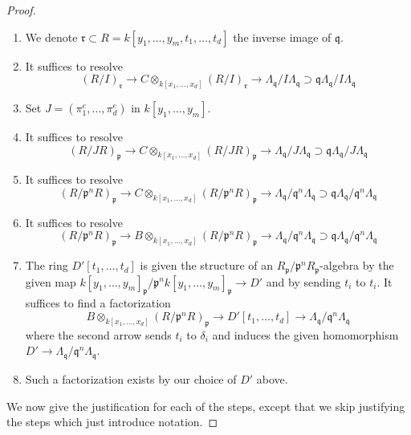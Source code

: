 \begin{proof}
\begin{enumerate}
$$
R/I
\to
C \otimes_{k[x_1, \ldots, x_d]} R/I
\to
\Lambda/I\Lambda \supset \mathfrak q/I\Lambda
$$
\item
\label{smoothing-item-set-r}
We denote $\mathfrak r \subset R = k[y_1, \ldots, y_m, t_1, \ldots, t_d]$
the inverse image of $\mathfrak q$.
\item
\label{smoothing-item-third-resolve}
It suffices to resolve
$$
(R/I)_\mathfrak r \to
C \otimes_{k[x_1, \ldots, x_d]} (R/I)_\mathfrak r \to
\Lambda_\mathfrak q/I\Lambda_\mathfrak q
\supset
\mathfrak q\Lambda_\mathfrak q/I\Lambda_\mathfrak q
$$
\item
\label{smoothing-item-fourth-resolve}
Set $J = (\pi_1^e, \ldots, \pi_d^e)$ in $k[y_1, \ldots, y_m]$.
\item
\label{smoothing-item-fifth-resolve}
It suffices to resolve
$$
(R/JR)_\mathfrak p \to
C \otimes_{k[x_1, \ldots, x_d]} (R/JR)_\mathfrak p \to
\Lambda_\mathfrak q/J\Lambda_\mathfrak q
\supset
\mathfrak q\Lambda_\mathfrak q/J\Lambda_\mathfrak q
$$
\item
\label{smoothing-item-sixth-resolve}
It suffices to resolve
$$
(R/\mathfrak p^nR)_\mathfrak p \to
C \otimes_{k[x_1, \ldots, x_d]} (R/\mathfrak p^nR)_\mathfrak p \to
\Lambda_\mathfrak q/\mathfrak q^n\Lambda_\mathfrak q
\supset
\mathfrak q\Lambda_\mathfrak q/\mathfrak q^n\Lambda_\mathfrak q
$$
\item
\label{smoothing-item-seventh-resolve}
It suffices to resolve
$$
(R/\mathfrak p^nR)_\mathfrak p \to
B \otimes_{k[x_1, \ldots, x_d]} (R/\mathfrak p^nR)_\mathfrak p \to
\Lambda_\mathfrak q/\mathfrak q^n\Lambda_\mathfrak q
\supset
\mathfrak q\Lambda_\mathfrak q/\mathfrak q^n\Lambda_\mathfrak q
$$
\item
\label{smoothing-item-eighth-resolve}
The ring $D'[t_1, \ldots, t_d]$ is given the structure of an
$R_\mathfrak p/\mathfrak p^nR_\mathfrak p$-algebra by the given map
$k[y_1, \ldots, y_m]_\mathfrak p/\mathfrak p^n k[y_1, \ldots, y_m]_\mathfrak p
\to D'$ and by sending $t_i$ to $t_i$. It suffices to find a factorization
$$
B \otimes_{k[x_1, \ldots, x_d]} (R/\mathfrak p^nR)_\mathfrak p
\to D'[t_1, \ldots, t_d] \to
\Lambda_\mathfrak q/\mathfrak q^n\Lambda_\mathfrak q
$$
where the second arrow sends $t_i$ to $\delta_i$ and induces the given
homomorphism $D' \to \Lambda_\mathfrak q/\mathfrak q^n\Lambda_\mathfrak q$.
\item
\label{smoothing-item-done}
Such a factorization exists by our choice of $D'$ above.
\end{enumerate}
We now give the justification for each of the steps, except that we
skip justifying the steps which just introduce notation.


\end{proof}
